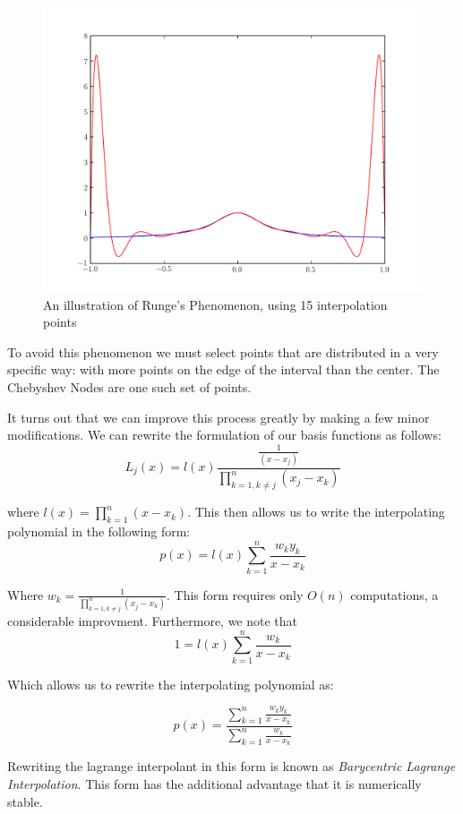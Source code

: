 \begin{figure}
\begin{center}
\includegraphics[scale = .5]{Runge.pdf}
\caption{An illustration of Runge's Phenomenon, using 15 interpolation points}
\label{Fig:Runge}
\end{center}
\end{figure}


To avoid this phenomenon we must select points that are distributed in a very specific way: with more points on the edge of the interval than the center. The Chebyshev Nodes are one such set of points.

It turns out that we can improve this process greatly by making a few minor modifications. We can rewrite the formulation of our basis functions as follows:
\[
L_j(x) = l(x)\frac{\frac{1}{(x-x_j)}}{\displaystyle\prod_{k=1, k \neq j}^n (x_j-x_k)}
\]

where $l(x) = \prod_{k=1}^n (x-x_k)$. This then allows us to write the interpolating polynomial in the following form:
\[
p(x) = l(x) \sum_{k=1}^n \frac{w_k y_k}{x-x_k}
\]

Where $w_k = \frac{1}{\prod_{k=1, k \neq j}^n (x_j-x_k)}$. This form requires only $O(n)$ computations, a considerable improvment. Furthermore, we note that
\[
1 = l(x) \sum_{k=1}^n \frac{w_k}{x-x_k}
\]

Which allows us to rewrite the interpolating polynomial as:

\[
p(x) = \frac{\displaystyle\sum_{k=1}^n \frac{w_k y_k}{x-x_k}}{\displaystyle\sum_{k=1}^n \frac{w_k}{x-x_k}}
\]

Rewriting the lagrange interpolant in this form is known as \emph{Barycentric Lagrange Interpolation}. This form has the additional advantage that it is numerically stable.

